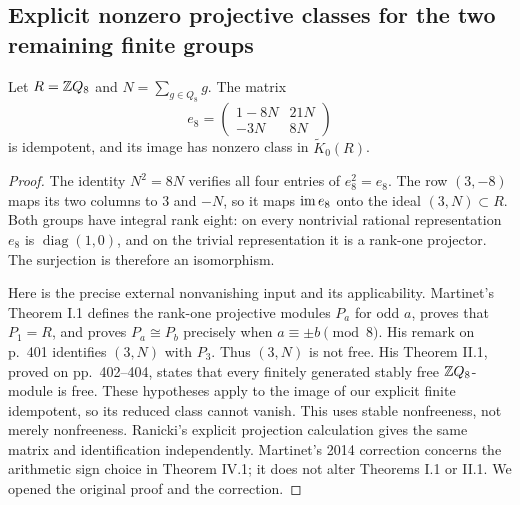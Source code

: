 \subsection{Explicit nonzero projective classes for the two remaining finite groups}\label{D:explicit-projectives}
\begin{proposition}\label{D:Q8-projector}
Let $R=\mathbb Z Q_8$ and $N=\sum_{g\in Q_8}g$. The matrix
\[
 e_8=\begin{pmatrix}1-8N&21N\\-3N&8N\end{pmatrix}
\]
is idempotent, and its image has nonzero class in $\widetilde K_0(R)$.
\end{proposition}
\begin{proof}
The identity $N^2=8N$ verifies all four entries of $e_8^2=e_8$.
The row $(3,-8)$ maps its two columns to $3$ and $-N$, so it maps
$\operatorname{im} e_8$ onto the ideal $(3,N)\subset R$. Both groups have integral
rank eight: on every nontrivial rational representation $e_8$ is
$\operatorname{diag}(1,0)$, and on the trivial representation it is a
rank-one projector. The surjection is therefore an isomorphism.

Here is the precise external nonvanishing input and its applicability.
Martinet's Theorem I.1 \cite[pp.~400--401]{martinet1971} defines the
rank-one projective modules $P_a$ for odd $a$, proves that $P_1=R$,
and proves $P_a\cong P_b$ precisely when $a\equiv\pm b\pmod8$.
His remark on p.~401 identifies $(3,N)$ with $P_3$.
Thus $(3,N)$ is not free. His Theorem II.1, proved on pp.~402--404,
states that every finitely generated stably free $\mathbb Z Q_8$-module is
free. These hypotheses apply to the image of our explicit finite
idempotent, so its reduced class cannot vanish. This uses stable
nonfreeness, not merely nonfreeness. Ranicki's explicit projection
calculation \cite[pp.~4--5]{ranickiExplicit} gives the same matrix and
identification independently. Martinet's 2014 correction
\cite{martinet2014correction} concerns the arithmetic sign choice in
Theorem IV.1; it does not alter Theorems I.1 or II.1. We opened the
original proof and the correction.
\end{proof}

